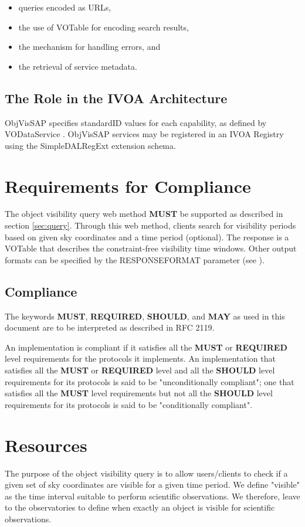 \documentclass[11pt,a4paper]{ivoa}
\begin{document}
\begin{itemize}
\item queries encoded as URLs,
\item the use of VOTable for encoding search results,
\item the mechanism for handling errors, and
\item the retrieval of service metadata.
\end{itemize}


\subsection{The Role in the IVOA Architecture}
ObjVisSAP specifies standardID values \citep{2016ivoa.spec.0523D} for each
capability, as defined by VODataService \citep{2010ivoa.spec.1202P}. ObjVisSAP
services may be registered in an IVOA Registry using the SimpleDALRegExt
\citep{2017ivoa.spec.0530P} extension schema.


\section{Requirements for Compliance}
The object visibility query web method \textbf{MUST} be supported as described
in section \ref{sec:query}. Through this web method, clients search for visibility
periods based on given sky coordinates and a time period (optional). The
response is a VOTable that describes the constraint-free visibility time
windows. Other output formats can be specified by the RESPONSEFORMAT
parameter (see \citet{2017ivoa.spec.0517D}).

\subsection{Compliance}
The keywords \textbf{MUST}, \textbf{REQUIRED}, \textbf{SHOULD},
and \textbf{MAY} as used in this document are to be interpreted as
described in RFC 2119.

An implementation is compliant if it satisfies all the \textbf{MUST}
or \textbf{REQUIRED} level requirements for the protocols it
implements. An implementation that satisfies all the \textbf{MUST} or
\textbf{REQUIRED} level and all the \textbf{SHOULD} level
requirements for its protocols is said to be "unconditionally
compliant"; one that satisfies all the \textbf{MUST} level
requirements but not all the \textbf{SHOULD} level requirements for
its protocols is said to be "conditionally compliant".

\section{Resources}
The purpose of the object visibility query is to allow users/clients to
check if a given set of sky coordinates are visible for a given time
period. We define "visible" as the time interval suitable to perform
scientific observations. We therefore, leave to the observatories to
define when exactly an object is visible for scientific observations.
\end{document}
